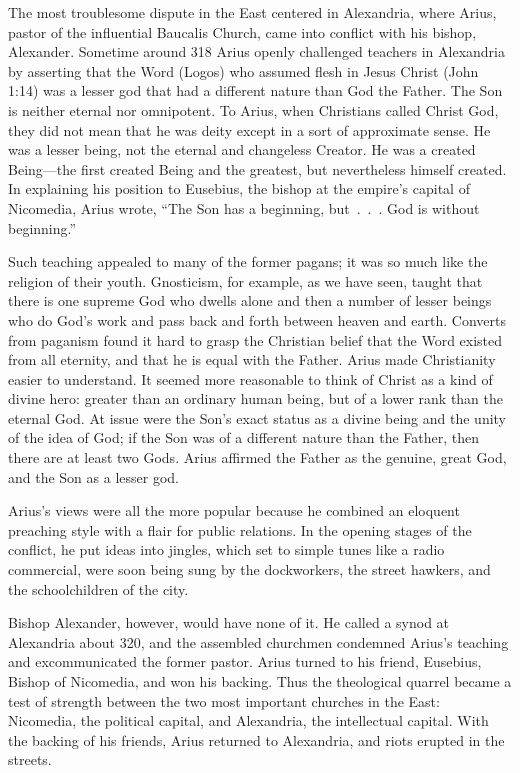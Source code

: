 The most troublesome dispute in the East centered in Alexandria, where Arius, pastor of the
influential Baucalis Church, came into conflict with his bishop, Alexander. Sometime around 318
Arius openly challenged teachers in Alexandria by asserting that the Word (Logos) who assumed flesh
in Jesus Christ (John 1:14) was a lesser god that had a different nature than God the Father. The
Son is neither eternal nor omnipotent. To Arius, when Christians called Christ God, they did not
mean that he was deity except in a sort of approximate sense. He was a lesser being, not the eternal
and changeless Creator. He was a created Being—the first created Being and the greatest, but
nevertheless himself created. In explaining his position to Eusebius, the bishop at the empire’s
capital of Nicomedia, Arius wrote, “The Son has a beginning, but~.~.~. God is without beginning.”

Such teaching appealed to many of the former pagans; it was so much like the religion of their
youth. Gnosticism, for example, as we have seen, taught that there is one supreme God who dwells
alone and then a number of lesser beings who do God’s work and pass back and forth between heaven
and earth. Converts from paganism found it hard to grasp the Christian belief that the Word existed
from all eternity, and that he is equal with the Father. Arius made Christianity easier to
understand. It seemed more reasonable to think of Christ as a kind of divine hero: greater than an
ordinary human being, but of a lower rank than the eternal God. At issue were the Son’s exact status
as a divine being and the unity of the idea of God; if the Son was of a different nature than the
Father, then there are at least two Gods. Arius affirmed the Father as the genuine, great God, and
the Son as a lesser god.

Arius’s views were all the more popular because he combined an eloquent preaching style with a flair
for public relations. In the opening stages of the conflict, he put ideas into jingles, which set to
simple tunes like a radio commercial, were soon being sung by the dockworkers, the street hawkers,
and the schoolchildren of the city.

Bishop Alexander, however, would have none of it. He called a synod at Alexandria about 320, and the
assembled churchmen condemned Arius’s teaching and excommunicated the former pastor. Arius turned to
his friend, Eusebius, Bishop of Nicomedia, and won his backing. Thus the theological quarrel became
a test of strength between the two most important churches in the East: Nicomedia, the political
capital, and Alexandria, the intellectual capital. With the backing of his friends, Arius returned
to Alexandria, and riots erupted in the streets.

